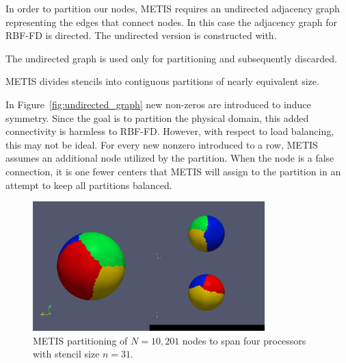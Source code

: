 \documentclass{report}
\begin{document}
In order to partition our nodes, METIS requires an undirected adjacency graph representing the edges that connect nodes. In this case the adjacency graph for RBF-FD is directed. The undirected version is constructed with. 

The undirected graph is used only for partitioning and subsequently discarded. 

METIS divides stencils into contiguous partitions of nearly equivalent size. 

In Figure~\ref{fig:undirected_graph} new non-zeros are introduced to induce symmetry. Since the goal is to partition the physical domain, this added connectivity is harmless to RBF-FD. However, with respect to load balancing, this may not be ideal. For every new nonzero introduced to a row, METIS assumes an additional node utilized by the partition. When the node is a false connection, it is one fewer centers that METIS will assign to the partition in an attempt to keep all partitions balanced. 




\begin{figure}[ht!]
\begin{center}
\includegraphics[width=0.8\textwidth]{rbffd_methods_content/decompositions/gpmetis_decomp_sphere_4parts.png}
\caption{METIS partitioning of $N=10,201$ nodes to span four processors with stencil size $n=31$. }
\label{fig:metis_decomposed_sphere}
\end{center}
\end{figure}

\end{document}
